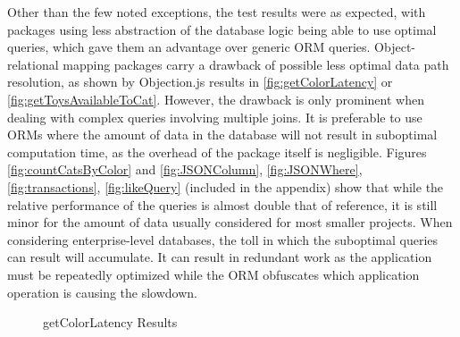 Other than the few noted exceptions, the test results were as expected, with
packages using less abstraction of the database logic being able to use optimal
queries, which gave them an advantage over generic ORM queries.
Object-relational mapping packages carry a drawback of possible less optimal
data path resolution, as shown by Objection.js results in
\autoref{fig:getColorLatency} or \autoref{fig:getToysAvailableToCat}. However,
the drawback is only prominent when dealing with complex queries involving
multiple joins. It is preferable to use ORMs where the amount of data in the
database will not result in suboptimal computation time, as the overhead of the
package itself is negligible. Figures \ref{fig:countCatsByColor} and
\ref{fig:JSONColumn}, \ref{fig:JSONWhere}, \ref{fig:transactions},
\ref{fig:likeQuery} (included in the appendix) show that while the relative
performance of the queries is almost double that of reference, it is still minor
for the amount of data usually considered for most smaller projects. When
considering enterprise-level databases, the toll in which the suboptimal queries
can result will accumulate. It can result in redundant work as the application
must be repeatedly optimized while the ORM obfuscates which application
operation is causing the slowdown. 


\begin{figure}[htbp]
  \caption{getColorLatency Results}
  \label{fig:getColorLatency}
\end{figure}

